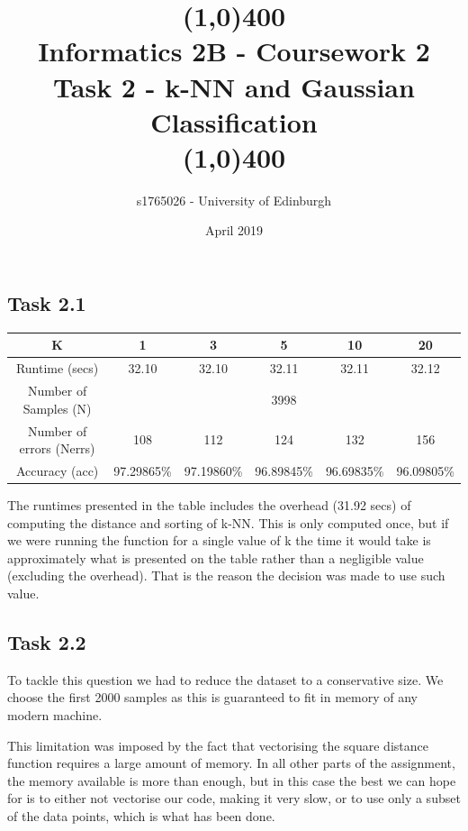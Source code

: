 \documentclass{article}
\title{\line(1,0){400}\\ \textbf{Informatics 2B - Coursework 2} \\ Task 2 - k-NN and Gaussian Classification\\\line(1,0){400}}
\author{s1765026 - University of Edinburgh}
\date{April 2019}
\begin{document}
\maketitle
\thispagestyle{empty} %

\newpage
{} %


\subsection*{Task 2.1}

\begin{center}
\begin{tabular}{ |c|c|c|c|c|c| } 
 \hline
 K & 1 & 3 & 5 & 10 & 20 \\ 
 \hline
 Runtime (secs) & 32.10 & 32.10 & 32.11 & 32.11 & 32.12 \\
 \hline
 Number of Samples (N) & \multicolumn{5}{|c|}{3998} \\
 \hline
 Number of errors (Nerrs) & 108 & 112 & 124 & 132 & 156 \\
 \hline
 Accuracy (acc) & 97.29865\% & 97.19860\% & 96.89845\% & 96.69835\% & 96.09805\% \\
 \hline
\end{tabular}
\end{center}

The runtimes presented in the table includes the overhead (31.92 secs) of computing the distance and sorting of k-NN. This is only computed once, but if we were running the function for a single value of k the time it would take is approximately what is presented on the table rather than a negligible value (excluding the overhead). That is the reason the decision was made to use such value.

\subsection*{Task 2.2}

To tackle this question we had to reduce the dataset to a conservative size. We choose the first 2000 samples as this is guaranteed to fit in memory of any modern machine. \par
This limitation was imposed by the fact that vectorising the square distance function requires a large amount of memory. In all other parts of the assignment, the memory available is more than enough, but in this case the best we can hope for is to either not vectorise our code, making it very slow, or to use only a subset of the data points, which is what has been done.
\end{document}
